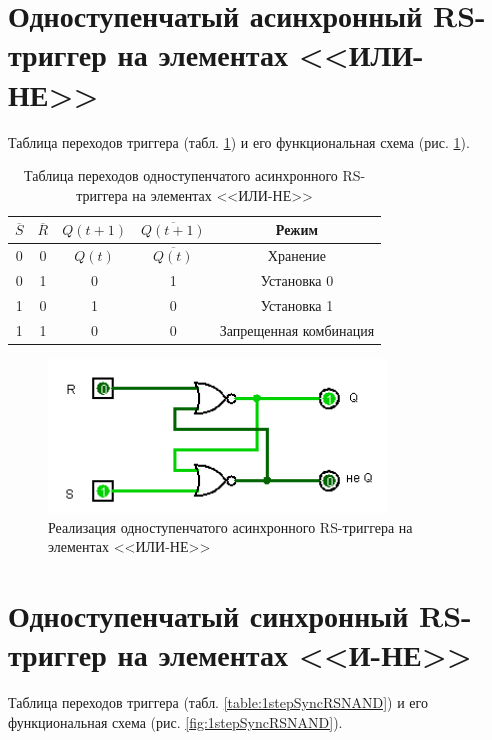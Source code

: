 \documentclass{mirea}
\begin{document}
\section{Одноступенчатый асинхронный RS-триггер на элементах <<ИЛИ-НЕ>>}
	Таблица переходов триггера (табл. \ref{table:1stepAsyncRSNOR}) и его функциональная схема (рис. \ref{fig:1stepAsyncRSNOR}).

	\begin{table}[H]
		\centering
		\caption{Таблица переходов одноступенчатого асинхронного RS-триггера на элементах <<ИЛИ-НЕ>>}
		\label{table:1stepAsyncRSNOR}
		\begin{tabular}{c|c|c|c|c}
			$ \overline{S} $ & $ \overline{R} $ & $ Q(t+1) $ & $ \overline{Q(t+1)} $ & Режим \\
			\hline
			0 & 0 & $ Q(t) $ & $\overline{Q(t)}$ & Хранение \\
			\hline
			0 & 1 & 0 & 1 & Установка 0 \\
			\hline
			1 & 0 & 1 & 0 & Установка 1 \\
			\hline
			1 & 1 & 0 & 0 & Запрещенная комбинация
		\end{tabular}
	\end{table}
	
	\begin{figure}[H]
		\centering
		\includegraphics[width=0.8\textwidth]{1stepAsyncRSNOR.png}
		\caption{Реализация одноступенчатого асинхронного RS-триггера на элементах <<ИЛИ-НЕ>>}
		\label{fig:1stepAsyncRSNOR}
	\end{figure}

\clearpage
\section{Одноступенчатый синхронный RS-триггер на элементах <<И-НЕ>>}
	Таблица переходов триггера (табл. \ref{table:1stepSyncRSNAND}) и его функциональная схема (рис. \ref{fig:1stepSyncRSNAND}).
\end{document}
